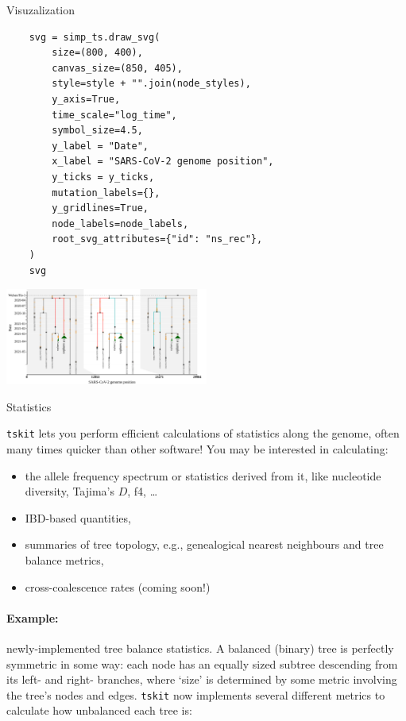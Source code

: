 \documentclass[landscape,a0paper,fontscale=0.4]{baposter}
\newcommand{\tskit}{{\texttt{tskit}}}
\newcommand{\compresslist}{%
 \setlength{\itemsep}{1pt}%
 \setlength{\parskip}{0pt}%
 \setlength{\parsep}{0pt}%
 }
\begin{document}
\begin{poster}
\begin{posterbox}[name=viz,column=1,row=0,span=2,below=overview]{Visuzalization}
\begin{multicols}{2}
\begin{verbatim}
    svg = simp_ts.draw_svg(
        size=(800, 400),
        canvas_size=(850, 405),
        style=style + "".join(node_styles),
        y_axis=True,
        time_scale="log_time",
        symbol_size=4.5,
        y_label = "Date",
        x_label = "SARS-CoV-2 genome position",
        y_ticks = y_ticks,
        mutation_labels={},
        y_gridlines=True,
        node_labels=node_labels,
        root_svg_attributes={"id": "ns_rec"},
    )
    svg
\end{verbatim}

\includegraphics[width=0.5\textwidth]{Covid_recombination}

\end{multicols}

\end{posterbox}



\begin{posterbox}[name=stats,column=3,row=0,span=1]{Statistics}

\tskit{} lets you perform efficient calculations of statistics along the genome, often many times quicker than other software! You may be interested in calculating:

\begin{itemize} \compresslist
    \item the allele frequency spectrum or statistics derived from it,
        like nucleotide diversity, Tajima's $D$, f4, \ldots
    \item IBD-based quantities,
    \item summaries of tree topology,
        e.g., genealogical nearest neighbours and tree balance metrics,
    \item cross-coalescence rates (coming soon!)
\end{itemize}

\paragraph{Example:} newly-implemented tree balance statistics. A balanced
(binary) tree is perfectly symmetric in some way: each node has an equally
sized subtree descending from its left- and right- branches, where `size'
is determined by some metric involving the tree's nodes and edges. \tskit{}
now implements several different metrics to calculate how unbalanced each
tree is:


\end{posterbox}
\end{poster}
\end{document}
